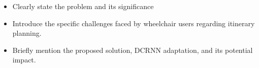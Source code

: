 \begin{itemize}
    \item Clearly state the problem and its significance
    \item Introduce the specific challenges faced by wheelchair users regarding itinerary planning.
    \item Briefly mention the proposed solution, DCRNN adaptation, and its potential impact.
\end{itemize}